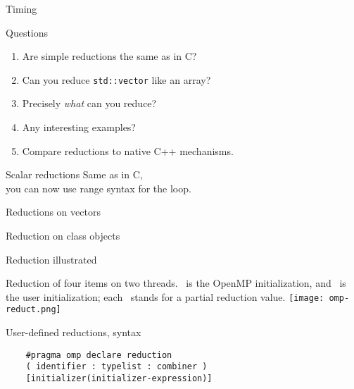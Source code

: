 \documentclass[10pt]{beamer}
\begin{document}
\begin{numberedframe}{Timing}
  
\end{numberedframe}


\begin{numberedframe}{Questions}
  \begin{enumerate}
  \item Are simple reductions the same as in C?
  \item Can you reduce \lstinline{std::vector} like an array?
  \item Precisely \emph{what} can you reduce?
  \item Any interesting examples?
  \item Compare reductions to native C++ mechanisms.
  \end{enumerate}
\end{numberedframe}

\begin{numberedframe}{Scalar reductions}
  Same as in C,\\
  you can now use range syntax for the loop.
\end{numberedframe}

\begin{numberedframe}{Reductions on vectors}
  
\end{numberedframe}

\begin{numberedframe}{Reduction on class objects}
  
\end{numberedframe}

\begin{numberedframe}{Reduction illustrated}
  \label{fig:omp-reduct}

  Reduction of four items on two threads.
  ~is the OpenMP initialization, and ~is the
  user initialization; each ~stands for a partial reduction value.
  \texttt{[image: omp-reduct.png]}
\end{numberedframe}

\begin{numberedframe}{User-defined reductions, syntax}
  \begin{lstlisting}
    #pragma omp declare reduction 
    ( identifier : typelist : combiner )
    [initializer(initializer-expression)]
  \end{lstlisting}
\end{numberedframe}
\end{document}
